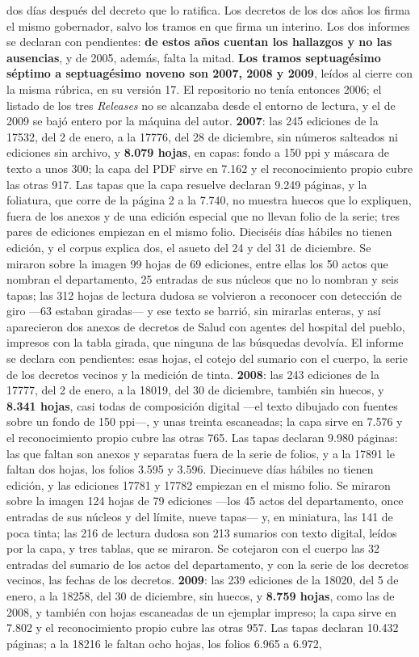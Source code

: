 dos días después del decreto que lo ratifica. Los decretos de los dos años los firma el mismo gobernador, salvo los tramos en que firma un interino. Los dos informes se declaran con pendientes: \textbf{de estos años cuentan los hallazgos y no las ausencias}, y de 2005, además, falta la mitad.
\textbf{Los tramos septuagésimo séptimo a septuagésimo noveno son 2007, 2008 y 2009}, leídos al cierre con la misma rúbrica, en su versión 17. El repositorio no tenía entonces 2006; el listado de los tres \textit{Releases} no se alcanzaba desde el entorno de lectura, y el de 2009 se bajó entero por la máquina del autor. \textbf{2007}: las 245 ediciones de la 17532, del 2 de enero, a la 17776, del 28 de diciembre, sin números salteados ni ediciones sin archivo, y \textbf{8.079 hojas}, en capas: fondo a 150 ppi y máscara de texto a unos 300; la capa del PDF sirve en 7.162 y el reconocimiento propio cubre las otras 917. Las tapas que la capa resuelve declaran 9.249 páginas, y la foliatura, que corre de la página 2 a la 7.740, no muestra huecos que lo expliquen, fuera de los anexos y de una edición especial que no llevan folio de la serie; tres pares de ediciones empiezan en el mismo folio. Dieciséis días hábiles no tienen edición, y el corpus explica dos, el asueto del 24 y del 31 de diciembre. Se miraron sobre la imagen 99 hojas de 69 ediciones, entre ellas los 50 actos que nombran el departamento, 25 entradas de sus núcleos que no lo nombran y seis tapas; las 312 hojas de lectura dudosa se volvieron a reconocer con detección de giro ---63 estaban giradas--- y ese texto se barrió, sin mirarlas enteras, y así aparecieron dos anexos de decretos de Salud con agentes del hospital del pueblo, impresos con la tabla girada, que ninguna de las búsquedas devolvía. El informe se declara con pendientes: esas hojas, el cotejo del sumario con el cuerpo, la serie de los decretos vecinos y la medición de tinta. \textbf{2008}: las 243 ediciones de la 17777, del 2 de enero, a la 18019, del 30 de diciembre, también sin huecos, y \textbf{8.341 hojas}, casi todas de composición digital ---el texto dibujado con fuentes sobre un fondo de 150 ppi---, y unas treinta escaneadas; la capa sirve en 7.576 y el reconocimiento propio cubre las otras 765. Las tapas declaran 9.980 páginas: las que faltan son anexos y separatas fuera de la serie de folios, y a la 17891 le faltan dos hojas, los folios 3.595 y 3.596. Diecinueve días hábiles no tienen edición, y las ediciones 17781 y 17782 empiezan en el mismo folio. Se miraron sobre la imagen 124 hojas de 79 ediciones ---los 45 actos del departamento, once entradas de sus núcleos y del límite, nueve tapas--- y, en miniatura, las 141 de poca tinta; las 216 de lectura dudosa son 213 sumarios con texto digital, leídos por la capa, y tres tablas, que se miraron. Se cotejaron con el cuerpo las 32 entradas del sumario de los actos del departamento, y con la serie de los decretos vecinos, las fechas de los decretos. \textbf{2009}: las 239 ediciones de la 18020, del 5 de enero, a la 18258, del 30 de diciembre, sin huecos, y \textbf{8.759 hojas}, como las de 2008, y también con hojas escaneadas de un ejemplar impreso; la capa sirve en 7.802 y el reconocimiento propio cubre las otras 957. Las tapas declaran 10.432 páginas; a la 18216 le faltan ocho hojas, los folios 6.965 a 6.972, 